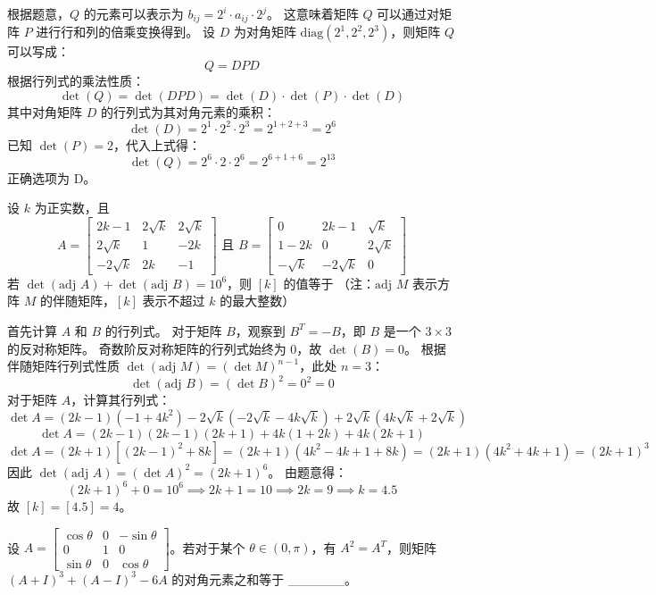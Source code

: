 \begin{questions}
\begin{solution}
根据题意，$Q$ 的元素可以表示为 $b_{ij} = 2^i \cdot a_{ij} \cdot 2^j$。
这意味着矩阵 $Q$ 可以通过对矩阵 $P$ 进行行和列的倍乘变换得到。
设 $D$ 为对角矩阵 $\text{diag}(2^1, 2^2, 2^3)$，则矩阵 $Q$ 可以写成：
\[
Q = D P D
\]
根据行列式的乘法性质：
\[
\det(Q) = \det(D P D) = \det(D) \cdot \det(P) \cdot \det(D)
\]
其中对角矩阵 $D$ 的行列式为其对角元素的乘积：
\[
\det(D) = 2^1 \cdot 2^2 \cdot 2^3 = 2^{1+2+3} = 2^6
\]
已知 $\det(P) = 2$，代入上式得：
\[
\det(Q) = 2^6 \cdot 2 \cdot 2^6 = 2^{6+1+6} = 2^{13}
\]
正确选项为 D。
\end{solution}

\question 设 $k$ 为正实数，且
\[
A = \begin{bmatrix} 2k-1 & 2\sqrt{k} & 2\sqrt{k} \\ 2\sqrt{k} & 1 & -2k \\ -2\sqrt{k} & 2k & -1 \end{bmatrix} \text{ 且 } B = \begin{bmatrix} 0 & 2k-1 & \sqrt{k} \\ 1-2k & 0 & 2\sqrt{k} \\ -\sqrt{k} & -2\sqrt{k} & 0 \end{bmatrix}
\]
若 $\det(\text{adj } A) + \det(\text{adj } B) = 10^6$，则 $[k]$ 的值等于
（注：$\text{adj } M$ 表示方阵 $M$ 的伴随矩阵，$[k]$ 表示不超过 $k$ 的最大整数）
\begin{solution}
首先计算 $A$ 和 $B$ 的行列式。
对于矩阵 $B$，观察到 $B^T = -B$，即 $B$ 是一个 $3 \times 3$ 的反对称矩阵。
奇数阶反对称矩阵的行列式始终为 $0$，故 $\det(B) = 0$。
根据伴随矩阵行列式性质 $\det(\text{adj } M) = (\det M)^{n-1}$，此处 $n=3$：
\[
\det(\text{adj } B) = (\det B)^2 = 0^2 = 0
\]
对于矩阵 $A$，计算其行列式：
\[
\det A = (2k-1)(-1 + 4k^2) - 2\sqrt{k}(-2\sqrt{k} - 4k\sqrt{k}) + 2\sqrt{k}(4k\sqrt{k} + 2\sqrt{k})
\]
\[
\det A = (2k-1)(2k-1)(2k+1) + 4k(1 + 2k) + 4k(2k + 1)
\]
\[
\det A = (2k+1)[(2k-1)^2 + 8k] = (2k+1)(4k^2 - 4k + 1 + 8k) = (2k+1)(4k^2 + 4k + 1) = (2k+1)^3
\]
因此 $\det(\text{adj } A) = (\det A)^2 = (2k+1)^6$。
由题意得：
\[
(2k+1)^6 + 0 = 10^6 \implies 2k+1 = 10 \implies 2k = 9 \implies k = 4.5
\]
故 $[k] = [4.5] = 4$。
\end{solution}
    \question
设 $A = \begin{bmatrix} \cos \theta & 0 & -\sin \theta \\ 0 & 1 & 0 \\ \sin \theta & 0 & \cos \theta \end{bmatrix}$。若对于某个 $\theta \in (0, \pi)$，有 $A^2 = A^T$，则矩阵 $(A + I)^3 + (A - I)^3 - 6A$ 的对角元素之和等于 \_\_\_\_\_\_。


\end{questions}
